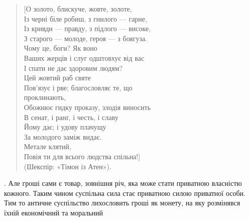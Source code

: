 {\begin{verse}
\hspace{2em}[О золото, блискуче, жовте, золоте, \\
\hspace{2em}Із черні біле робиш, з гнилого — гарне,\\
\hspace{2em}Із кривди — правду, з підлого — високе,\\
\hspace{2em}З старого — молоде, героя — з боягуза.\\
\hspace{5em}Чому це, боги? Як воно\\
\hspace{2em}Ваших жерців і слуг одштовхує від вас\\
\hspace{2em}І спати не дає здоровим людям?\\
\hspace{2em}Цей жовтий раб святе\\
\hspace{2em}Пов’язує і рве; благословляє те, що\\
\hspace{5em}проклинають,\\
\hspace{2em}Обожнює гидку проказу, злодія виносить\\
\hspace{2em}В сенат, і ранґ, і честь, і славу\\
\hspace{2em}Йому дає; і удову плачущу\\
\hspace{2em}За молодого заміж видає.\\
\hspace{2em}Метале клятий,\\
\hspace{2em}Повія ти для всього людства спільна!]\\
\hspace{4em}(Шекспір: «Тімон із Атен»).
\end{verse}
}.
Але гроші сами є товар, зовнішня річ, яка може стати приватною
власністю кожного. Таким чином суспільна сила стає приватною
силою приватної особи. Тим то античне суспільство лихословить
гроші як монету, на яку розмінявся їхній економічний та моральний
